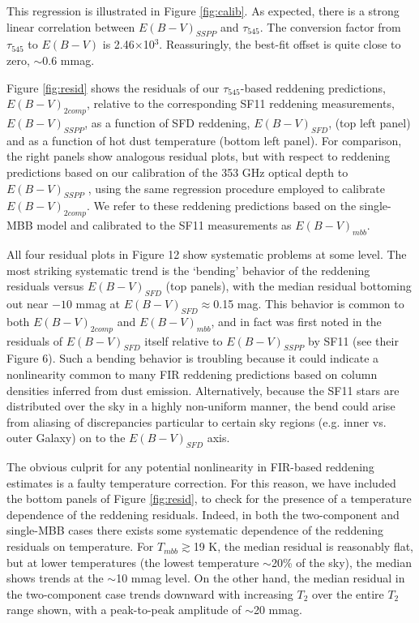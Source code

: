\documentclass{emulateapj}
\begin{document}

This regression is illustrated in Figure \ref{fig:calib}. As expected, there 
is a strong linear correlation between $E(B-V)_{SSPP}$ and $\tau_{545}$. The 
conversion factor from $\tau_{545}$ to $E(B-V)$ is 2.46$\times$10$^{3}$. 
Reassuringly, the best-fit offset is quite close to zero, $\sim$0.6 mmag.

Figure \ref{fig:resid} shows the residuals of our $\tau_{545}$-based reddening 
predictions, $E(B-V)_{2comp}$, relative to the corresponding SF11 reddening 
measurements, $E(B-V)_{SSPP}$, as a function of SFD reddening, $E(B-V)_{SFD}$, 
(top left panel) and as a function of hot dust temperature (bottom left panel).
For comparison, the right panels show analogous residual plots, but with 
respect to reddening predictions based on our calibration of the 
\cite{planckdust} 353 GHz optical depth to $E(B-V)_{SSPP}$ , using the same 
regression procedure employed to calibrate $E(B-V)_{2comp}$. We refer to these 
reddening predictions based on the \cite{planckdust} single-MBB model and 
calibrated to the SF11 measurements as $E(B-V)_{mbb}$.

All four residual plots in Figure 12 show systematic problems at some level. 
The most striking systematic trend is the `bending' behavior of the reddening
residuals versus $E(B-V)_{SFD}$ (top panels), with the median residual 
bottoming out near $-10$ mmag at $E(B-V)_{SFD}$$\approx$0.15 mag. This behavior
is common to both $E(B-V)_{2comp}$ and $E(B-V)_{mbb}$, and in fact was first 
noted in the residuals of $E(B-V)_{SFD}$ itself relative to $E(B-V)_{SSPP}$ by 
SF11 (see their Figure 6). Such a bending behavior is troubling because it 
could indicate a nonlinearity common to many FIR reddening predictions based on
column densities inferred from dust emission. Alternatively, because the SF11 
stars are distributed over the sky in a highly non-uniform manner, the bend 
could arise from aliasing of discrepancies particular to certain sky regions 
(e.g. inner vs. outer Galaxy) on to the $E(B-V)_{SFD}$ axis.


The obvious culprit for any potential nonlinearity in FIR-based reddening
estimates is a faulty temperature correction. For this reason, we have included
the bottom panels of Figure \ref{fig:resid}, to check for the presence of
a temperature dependence of the reddening residuals. Indeed, in both the
two-component and single-MBB cases there exists some systematic dependence of
the reddening residuals on temperature. For $T_{mbb}$$\gtrsim$19 K, the 
median residual is reasonably flat, but at lower temperatures (the lowest 
temperature $\sim$20\% of the sky), the median shows trends at the $\sim$10 
mmag level. On the other hand, the median residual in the two-component case 
trends downward with increasing $T_2$ over the entire $T_2$ range shown, with a
peak-to-peak amplitude of $\sim$20 mmag.
\end{document}
